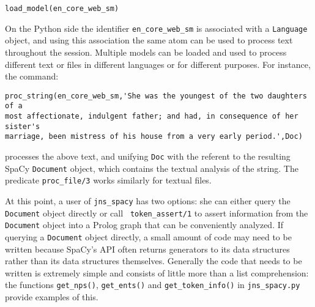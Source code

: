 \begin{verbatim}
load_model(en_core_web_sm) 
\end{verbatim}

\noindent
On the Python side the identifier {\tt en\_core\_web\_sm} is
associated with a {\tt Language} object, and using this
association the same atom can be used to process text throughout the
session.  Multiple models can be loaded and used to process different
text or files in different languages or for different purposes.  For
instance, the command:

\begin{verbatim}
proc_string(en_core_web_sm,'She was the youngest of the two daughters of a
most affectionate, indulgent father; and had, in consequence of her sister's
marriage, been mistress of his house from a very early period.',Doc)
\end{verbatim}

\noindent
processes the above text, and unifying {\tt Doc} with the referent to
the resulting SpaCy {\tt Document} object, which contains the textual
analysis of the string.  The predicate {\tt proc\_file/3} works
similarly for textual files.

At this point, a user of {\tt jns\_spacy} has two options: she can
either query the {\tt Document} object directly or call {\tt
  token\_assert/1} to assert information from the {\tt Document}
object into a Prolog graph that can be conveniently analyzed.  If
querying a {\tt Document} object directly, a small amount of code may
need to be written because SpaCy's API often returns generators to its
data structures rather than its data structures themselves.  Generally
the code that needs to be written is extremely simple and consists of
little more than a list comprehension: the functions {\tt get\_nps()},
{\tt get\_ents()} and {\tt get\_token\_info()} in {\tt jns\_spacy.py}
provide examples of this.


